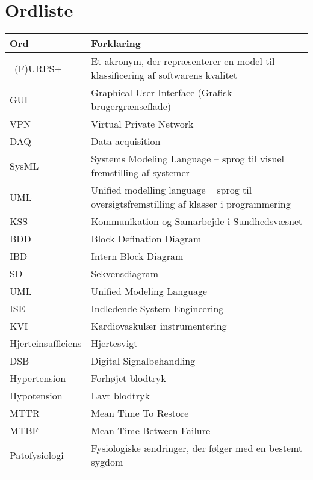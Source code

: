 \chapter{Ordliste}

\begin{longtabu} to 
    Ord &    Forklaring\\
    \toprule \
   (F)URPS+ 	&    Et akronym, der repræsenterer en model til klassificering af softwarens kvalitet \\
    GUI		&	Graphical User Interface (Grafisk brugergrænseflade)\\
    VPN		&	Virtual Private Network\\
    DAQ		&	Data acquisition \\
    SysML	&   Systems Modeling Language – sprog til visuel fremstilling af systemer \\
    UML		& Unified modelling language – sprog til oversigtsfremstilling af klasser i programmering \\
    KSS		&	Kommunikation og Samarbejde i Sundhedsvæsnet \\
    BDD 	&	Block Defination Diagram \\
	IBD		& 	Intern Block Diagram \\
	SD		& 	Sekvensdiagram \\
	UML		& 	Unified Modeling Language \\
	ISE 	&	Indledende System Engineering \\
	KVI		&	Kardiovaskulær instrumentering \\
	Hjerteinsufficiens &  Hjertesvigt \\
	DSB		&	Digital Signalbehandling \\
	Hypertension &  Forhøjet blodtryk \\
	Hypotension & Lavt blodtryk \\
	MTTR	&	Mean Time To Restore \\
	MTBF	&	Mean Time Between Failure \\
	Patofysiologi & Fysiologiske ændringer, der følger med en bestemt sygdom \\
 
\label{forkort}
\end{longtabu}